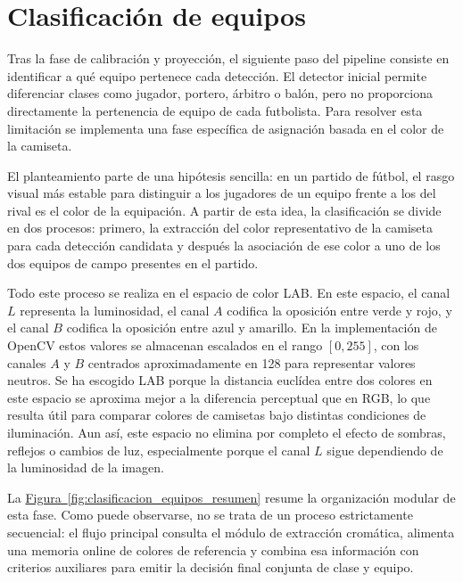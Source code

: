 \section{Clasificación de equipos}

Tras la fase de calibración y proyección, el siguiente paso del pipeline consiste en identificar a qué equipo pertenece cada detección. El detector inicial permite diferenciar clases como jugador, portero, árbitro o balón, pero no proporciona directamente la pertenencia de equipo de cada futbolista. Para resolver esta limitación se implementa una fase específica de asignación basada en el color de la camiseta.

El planteamiento parte de una hipótesis sencilla: en un partido de fútbol, el rasgo visual más estable para distinguir a los jugadores de un equipo frente a los del rival es el color de la equipación. A partir de esta idea, la clasificación se divide en dos procesos: primero, la extracción del color representativo de la camiseta para cada detección candidata y después la asociación de ese color a uno de los dos equipos de campo presentes en el partido.

Todo este proceso se realiza en el espacio de color LAB. En este espacio, el canal $L$ representa la luminosidad, el canal $A$ codifica la oposición entre verde y rojo, y el canal $B$ codifica la oposición entre azul y amarillo. En la implementación de OpenCV estos valores se almacenan escalados en el rango $[0,255]$, con los canales $A$ y $B$ centrados aproximadamente en 128 para representar valores neutros. Se ha escogido LAB porque la distancia euclídea entre dos colores en este espacio se aproxima mejor a la diferencia perceptual que en RGB, lo que resulta útil para comparar colores de camisetas bajo distintas condiciones de iluminación. Aun así, este espacio no elimina por completo el efecto de sombras, reflejos o cambios de luz, especialmente porque el canal $L$ sigue dependiendo de la luminosidad de la imagen.    

La \hyperref[fig:clasificacion_equipos_resumen]{Figura~\ref*{fig:clasificacion_equipos_resumen}} resume la organización modular de esta fase. Como puede observarse, no se trata de un proceso estrictamente secuencial: el flujo principal consulta el módulo de extracción cromática, alimenta una memoria online de colores de referencia y combina esa información con criterios auxiliares para emitir la decisión final conjunta de clase y equipo.


